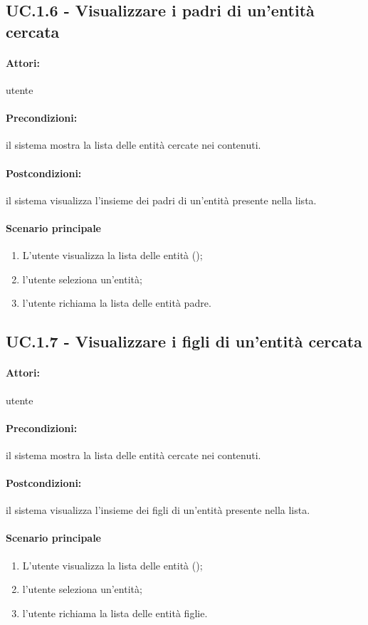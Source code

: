 \documentclass[10pt,a4paper,headinclude,footinclude,hidelinks]{scrreprt} %
\begin{document}
	\subsection[UC.1.6]{UC.1.6 - Visualizzare i padri di un'entità cercata}
	\label{sec:stage:ar:uc:1_6}
	\paragraph{Attori:} utente
	\paragraph{Precondizioni:} il sistema mostra la lista delle entità cercate nei contenuti.
	\paragraph{Postcondizioni:} il sistema visualizza l'insieme dei padri di un'entità presente nella lista.
	\paragraph{Scenario principale}
	\begin{enumerate}
	\item L'utente visualizza la lista delle entità ();
	\item l'utente seleziona un'entità;
	\item l'utente richiama la lista delle entità padre.
	\end{enumerate}

	\subsection[UC.1.7]{UC.1.7 - Visualizzare i figli di un'entità cercata}
	\label{sec:stage:ar:uc:1_7}
	\paragraph{Attori:} utente
	\paragraph{Precondizioni:} il sistema mostra la lista delle entità cercate nei contenuti.
	\paragraph{Postcondizioni:} il sistema visualizza l'insieme dei figli di un'entità presente nella lista.
	\paragraph{Scenario principale}
	\begin{enumerate}
	\item L'utente visualizza la lista delle entità ();
	\item l'utente seleziona un'entità;
	\item l'utente richiama la lista delle entità figlie.
	\end{enumerate}
\end{document}
